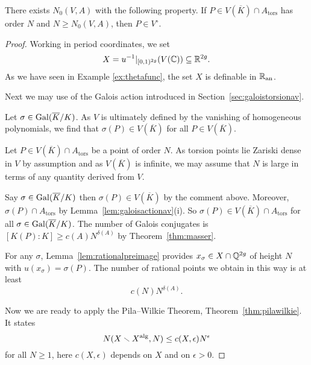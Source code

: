 \begin{lemma}
  \label{lem:apppw}
  There exists $N_0(V,A)$ with the following property. If
  $P\in V(\overline K)\cap A_{\mathrm{tors}}$ has order $N$
  and $N\ge N_0(V,A)$, then $P\in V^{\circ}$.
\end{lemma}
\begin{proof}

  Working in period coordinates, we set
  \begin{equation*}
    X = u^{-1}|_{[0,1)^{2g}}(V({\mathbb{C}})) \subseteq {\mathbb{R}}^{2g}.
  \end{equation*}
  As we have seen in Example \ref{ex:thetafunc},
  the set $X$ is definable in ${{\mathbb{R}}_{\mathrm{an}}}$. 


  Next we may use of the Galois action introduced in
  Section~\ref{sec:galoistorsionav}.

  Let $\sigma\in \mathrm{Gal}(\overline{K}/K)$. As $V$ is ultimately defined by the
  vanishing of homogeneous polynomials, we find that $\sigma(P)\in
  V(\overline K)$ for all $P\in V(\overline K)$.

  Let $P\in V(\overline K) \cap A_{\mathrm{tors}}$ be a point of order
  $N$. As torsion points lie Zariski dense in $V$ by assumption and as
  $V(\overline K)$ is infinite, we may assume that $N$ is large in terms
  of any quantity derived from $V$.

  Say $\sigma\in \mathrm{Gal}(\overline{K}/K)$ then $\sigma(P)\in V(\overline K)$ by the
  comment above. Moreover, $\sigma(P)\cap A_{\mathrm{tors}}$ by
  Lemma~\ref{lem:galoisactionav}(i). So $\sigma(P) \in V(\overline
  K)\cap A_{\mathrm{tors}}$ for all $\sigma\in \mathrm{Gal}(\overline{K}/K)$. The number of
  Galois conjugates is $[K(P):K]\ge c(A) N^{\delta(A)}$ by
  Theorem~\ref{thm:masser}. 

  For any $\sigma$, Lemma~\ref{lem:rationalpreimage} provides $x_\sigma
  \in X\cap{\mathbb{Q}}^{2g}$ of height $N$ with $u(x_\sigma) = \sigma(P)$. The
  number of rational points we obtain in this way is at least
  \begin{equation}
    \label{eq:rtlptub}
    c(N) N^{\delta(A)}. 
  \end{equation}

  Now we are ready to apply the Pila--Wilkie Theorem,
  Theorem~\ref{thm:pilawilkie}. It states
  \begin{equation}
    \label{eq:rtlptlb}
    N(X\smallsetminus X^{\mathrm{alg}},N) \le
    c(X,\epsilon)N^\epsilon 
  \end{equation}
  for all $N\ge 1$, here $c(X,\epsilon)$ depends on $X$ and on $\epsilon
  > 0$.


\end{proof}
